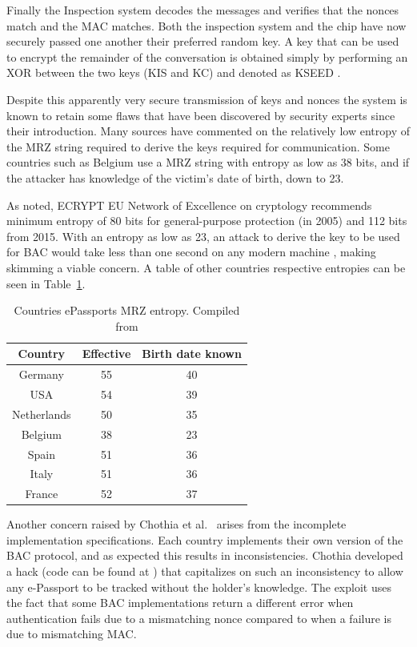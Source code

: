 \documentclass[12pt]{article}
\begin{document}
Finally the Inspection system decodes the messages and verifies that the nonces match and the MAC matches. Both the inspection system and the chip have now securely passed one another their preferred random key. A key that can be used to encrypt the remainder of the conversation is obtained simply by performing an XOR between the two keys (KIS and KC) and denoted as KSEED \cite{Chothia:2010wf}.
 

Despite this apparently very secure transmission of keys and nonces the system is known to retain some flaws that have been discovered by security experts since their introduction. Many sources \cite{Juels:2005wf, Avoine:2008wf} have commented on the relatively low entropy of the MRZ string required to derive the keys required for communication. Some countries such as Belgium use a MRZ string with entropy as low as 38 bits, and if the attacker has knowledge of the victim's date of birth, down to 23.

As \cite{Hoepman:2006tg} noted, ECRYPT EU Network of Excellence on cryptology recommends minimum entropy of 80 bits for general-purpose protection (in 2005) and 112 bits from 2015. With an entropy as low as 23, an attack to derive the key to be used for BAC would take less than one second on any modern machine \cite{Avoine:2008wf}, making skimming a viable concern. A table of other countries respective entropies can be seen in Table~\ref{tab:MRZ-entropy}.

\begin{table}
    \centering
    \begin{tabular}{|c|c|c|}
        \hline
        Country&Effective&Birth date known\\
        \hline
        Germany&55&40\\
        \hline
        USA&54&39\\
        \hline
        Netherlands&50&35\\
        \hline
        Belgium&38&23\\
        \hline
        Spain&51&36\\
        \hline
        Italy&51&36\\
        \hline
        France&52&37\\
        \hline
    \end{tabular}
    \caption{Countries ePassports MRZ entropy. Compiled from \cite{deladefencenationale:2008wf, Avoine:2008wf}}
    \label{tab:MRZ-entropy}
\end{table}

Another concern raised by Chothia et al.\ \cite{Chothia:2010wf} arises from the incomplete implementation specifications. Each country implements their own version of the BAC protocol, and as expected this results in inconsistencies. Chothia developed a hack (code can be found at \cite{ChothiaPassportAtt:wz}) that capitalizes on such an inconsistency to allow any e-Passport to be tracked without the holder's knowledge. The exploit uses the fact that some BAC implementations return a different error when authentication fails due to a mismatching nonce compared to when a failure is due to mismatching MAC.
\end{document}

